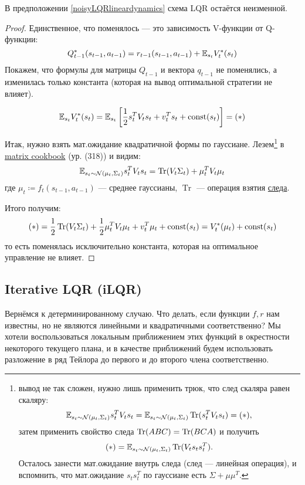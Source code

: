 \begin{theorem}
В предположении \eqref{noisyLQRlineardynamics} схема LQR остаётся неизменной.
\begin{proof}
Единственное, что поменялось --- это зависимость V-функции от Q-функции:
$$Q^*_{t-1}(s_{t-1}, a_{t-1}) = r_{t-1}(s_{t-1}, a_{t-1}) + \mathbb{E}_{s_t} V_t^*(s_t)$$
Покажем, что формулы для матрицы $Q_{t-1}$ и вектора $q_{t-1}$ не поменялись, а изменилась только константа (которая на вывод оптимальной стратегии не влияет).

$$\mathbb{E}_{s_t} V^*_t(s_t) = \mathbb{E}_{s_t} \left[ \frac{1}{2} s_t^TV_ts_t + v_t^T s_t + \operatorname{const}(s_t) \right] = (*)$$

Итак, нужно взять мат.ожидание квадратичной формы по гауссиане. Лезем\footnote[*]{вывод не так сложен, нужно лишь применить трюк, что след скаляра равен скаляру: $$\mathbb{E}_{s_t \sim \mathcal{N}(\mu_t, \Sigma_t)} s_t^TV_ts_t = \mathbb{E}_{s_t \sim \mathcal{N}(\mu_t, \Sigma_t)} \operatorname{Tr}(s_t^TV_ts_t) = (*),$$ затем применить свойство следа $\operatorname{Tr}(ABC) = \operatorname{Tr}(BCA)$ и получить $$(*) = \mathbb{E}_{s_t \sim \mathcal{N}(\mu_t, \Sigma_t)} \operatorname{Tr}(V_ts_ts_t^T).$$ Осталось занести мат.ожидание внутрь следа (след --- линейная операция), и вспомнить, что мат.ожидание $s_t s_t^T$ по гауссиане есть $\Sigma + \mu \mu^T$.} в \href{https://www.math.uwaterloo.ca/~hwolkowi/matrixcookbook.pdf}{matrix cookbook} (ур. (318)) и видим:
$$\mathbb{E}_{s_t \sim \mathcal{N}(\mu_t, \Sigma_t)} s_t^TV_ts_t = \operatorname{Tr}(V_t \Sigma_t) + \mu_t^TV_t\mu_t$$
где $\mu_t \coloneqq f_t(s_{t-1}, a_{t-1})$ --- среднее гауссианы, $\operatorname{Tr}$ --- операция взятия \href{https://ru.wikipedia.org/wiki/\%D0\%A1\%D0\%BB\%D0\%B5\%D0\%B4_\%D0\%BC\%D0\%B0\%D1\%82\%D1\%80\%D0\%B8\%D1\%86\%D1\%8B}{следа}.

Итого получим:
$$(*) = \frac{1}{2} \operatorname{Tr}(V_t \Sigma_t) + \frac{1}{2} \mu_t^TV_t\mu_t + v_t^T \mu_t + \operatorname{const}(s_t) = V^*_t(\mu_t) + \operatorname{const}(s_t)$$
то есть поменялась исключительно константа, которая на оптимальное управление не влияет.
\end{proof}
\end{theorem}

\subsection{Iterative LQR (iLQR)}

Вернёмся к детерминированному случаю. Что делать, если функции $f, r$ нам известны, но не являются линейными и квадратичными соответственно? Мы хотели воспользоваться локальным приближением этих функций в окрестности некоторого текущего плана, и в качестве приближений будем использовать разложение в ряд Тейлора до первого и до второго члена соответственно.

